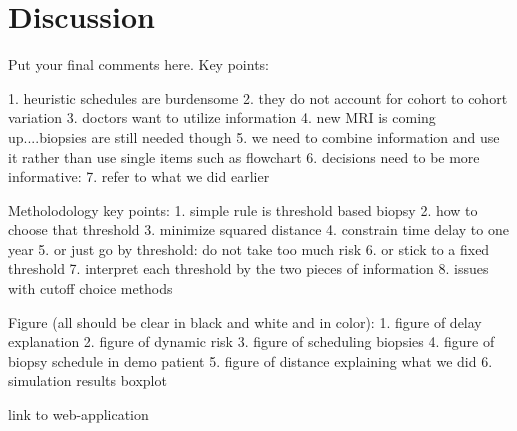 \section{Discussion}
\label{sec:discussion}

Put your final comments here. 
Key points:

1. heuristic schedules are burdensome
2. they do not account for cohort to cohort variation
3. doctors want to utilize information
4. new MRI is coming up....biopsies are still needed though
5. we need to combine information and use it rather than use single items such as flowchart
6. decisions need to be more informative: 
7. refer to what we did earlier

Metholodology key points:
1. simple rule is threshold based biopsy
2. how to choose that threshold
3. minimize squared distance
4. constrain time delay to one year
5. or just go by threshold: do not take too much risk
6. or stick to a fixed threshold
7. interpret each threshold by the two pieces of information
8. issues with cutoff choice methods

Figure (all should be clear in black and white and in color):
1. figure of delay explanation
2. figure of dynamic risk
3. figure of scheduling biopsies
4. figure of biopsy schedule in demo patient
5. figure of distance explaining what we did
6. simulation results boxplot


link to web-application